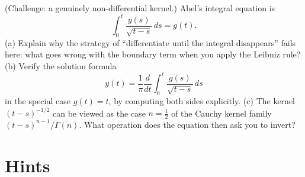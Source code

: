 \documentclass{essay}
\begin{document}
\begin{exercise}\label{ex:abel}
  (Challenge: a genuinely non-differential kernel.) Abel's integral equation is
  \[
    \int_0^t \frac{y(s)}{\sqrt{t - s}}\, ds = g(t).
  \]
  (a) Explain why the strategy of ``differentiate until the integral disappears'' fails here: what goes wrong with the boundary term when you apply the Leibniz rule? (b) Verify the solution formula
  \[
    y(t) = \frac{1}{\pi} \frac{d}{dt} \int_0^t \frac{g(s)}{\sqrt{t - s}}\, ds
  \]
  in the special case $g(t) = t$, by computing both sides explicitly. (c) The kernel $(t-s)^{-1/2}$ can be viewed as the case $n = \tfrac12$ of the Cauchy kernel family $(t-s)^{n-1}/\Gamma(n)$. What operation does the equation then ask you to invert?
\end{exercise}

\clearpage
\section{Hints}
\end{document}
